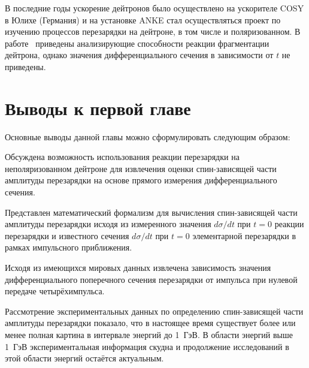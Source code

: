 В последние годы ускорение дейтронов \! было осуществлено на ускорителе COSY в
Юлихе (Германия) и на установке ANKE стал осуществляться проект по изучению
процессов перезарядки на дейтроне, в том числе и поляризованном. В
работе~\cite{chila09} приведены анализирующие способности реакции фрагментации
дейтрона, однако значения дифференциального сечения в зависимости от $t$ не
приведены.

\section{Выводы к первой главе}
Основные выводы данной главы можно сформулировать следующим образом:
\begin{list}{}{\leftmargin=1em}
\item Обсуждена возможность использования реакции перезарядки на
  неполяризованном дейтроне для извлечения оценки спин-зависящей части амплитуды
  \np перезарядки на основе прямого измерения дифференциального сечения.
\item Представлен математический формализм для вычисления спин-зависящей части
  амплитуды \np перезарядки исходя из измеренного значения $d\sigma/dt$ при
  $t=0$ реакции перезарядки  \dpchex и известного сечения $d\sigma/dt$  при
  $t=0$ элементарной перезарядки \np в рамках импульсного приближения.
\item Исходя из имеющихся мировых данных извлечена зависимость значения
  дифференциального поперечного сечения \np перезарядки от импульса при нулевой
  передаче четырёхимпульса.
\item Рассмотрение экспериментальных данных по определению спин-зависящей части
  амплитуды \np перезарядки показало, что в настоящее время существует более или
  менее полная картина в интервале энергий до 1~ГэВ. В области энергий выше
  1~ГэВ экспериментальная информация скудна и продолжение исследований в этой
  области энергий остаётся актуальным.
\end{list}

